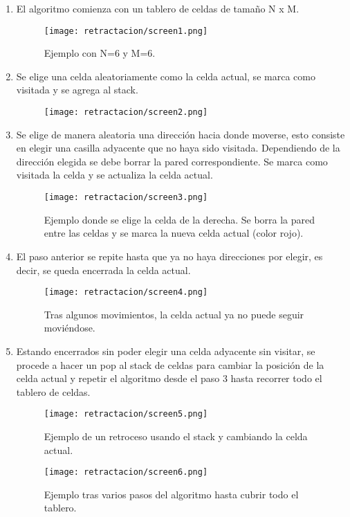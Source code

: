 \begin{enumerate}
  \item El algoritmo comienza con un tablero de celdas de tamaño N x M.
    \begin{figure}[h!]
      \centering
      \texttt{[image: retractacion/screen1.png]}
      \caption{Ejemplo con N=6 y M=6.}
      \label{fig:tablero1}
    \end{figure}
  \item Se elige una celda aleatoriamente como la celda actual, se marca como visitada y se agrega al stack.
    \begin{figure}[h!]
      \centering
      \texttt{[image: retractacion/screen2.png]}
      \caption{}
      \label{fig:tablero2}
    \end{figure}
  \item Se elige de manera aleatoria una dirección hacia donde moverse, esto consiste en elegir una casilla adyacente que no haya sido visitada. Dependiendo de la dirección elegida se debe borrar la pared correspondiente. Se marca como visitada la celda y se actualiza la celda actual.
    \pagebreak
    \begin{figure}[h!]
      \centering
      \texttt{[image: retractacion/screen3.png]}
      \caption{Ejemplo donde se elige la celda de la derecha. Se borra la pared entre las celdas y se marca la nueva celda actual (color rojo).}
      \label{fig:tablero3}
    \end{figure}
  \item El paso anterior se repite hasta que ya no haya direcciones por elegir, es decir, se queda encerrada la celda actual.
    \begin{figure}[h!]
      \centering
      \texttt{[image: retractacion/screen4.png]}
      \caption{Tras algunos movimientos, la celda actual ya no puede seguir moviéndose.}
      \label{fig:tablero4}
    \end{figure}
  \item Estando encerrados sin poder elegir una celda adyacente sin visitar, se procede a hacer un pop al stack de celdas para cambiar la posición de la celda actual y repetir el algoritmo desde el paso 3 hasta recorrer todo el tablero de celdas.
    \begin{figure}[h!]
      \centering
      \texttt{[image: retractacion/screen5.png]}
      \caption{Ejemplo de un retroceso usando el stack y cambiando la celda actual.}
      \label{fig:tablero5}
    \end{figure}
    \pagebreak
    \begin{figure}[h!]
      \centering
      \texttt{[image: retractacion/screen6.png]}
      \caption{Ejemplo tras varios pasos del algoritmo hasta cubrir todo el tablero.}
      \label{fig:tablero6}
    \end{figure}
\end{enumerate}


